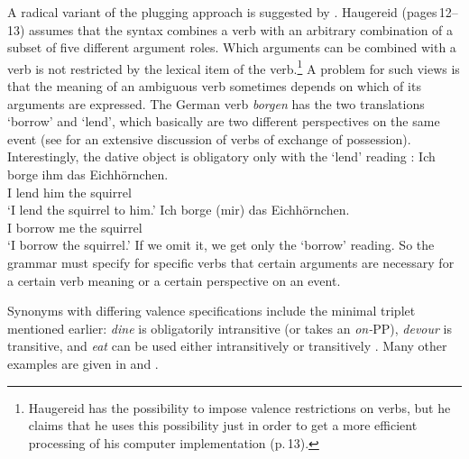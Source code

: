\begin{exe}
\begin{xlist}[iv.]
\begin{exe}
\begin{xlist}[iv.]
A radical variant of the plugging approach is suggested by \citet{Haugereid2009a}. Haugereid
(pages\,12--13) assumes that the syntax combines a verb with an arbitrary combination of a subset of
five different argument roles. Which arguments can be combined with a verb is not restricted by the
lexical item of the verb.\footnote{ 
  Haugereid has the possibility to impose valence restrictions on verbs, but he claims that he uses
  this possibility just in order to get a more efficient processing of his computer implementation (p.\,13).
}
A problem for such views is that the meaning of an ambiguous verb sometimes depends on which of its arguments are expressed. 
The German verb
\emph{borgen}
has the two translations `borrow' and `lend', which basically are two different perspectives on the same event (see
 for an extensive discussion of verbs of exchange of possession). 
Interestingly, the dative object is obligatory only with the `lend' reading \citep[]{MuellerGTBuch1}:
\eal
\ex 
\gll Ich borge ihm das Eichhörnchen.\\
     I   lend  him the squirrel\\
\glt `I lend the squirrel to him.'
\ex 
\gll Ich borge (mir) das Eichhörnchen.\\
     I borrow me the squirrel\\
\glt `I borrow the squirrel.'
\zl
If we omit it, we get only the `borrow' reading. 
So the grammar must specify for specific verbs that
 certain arguments are
necessary for a certain verb meaning or a certain perspective on an event.

Synonyms with differing valence specifications include the minimal triplet mentioned earlier: \emph{dine} is obligatorily intransitive (or takes an \emph{on-}PP), \emph{devour} is transitive, and \emph{eat} can be used either intransitively or transitively \citep[--90]{Dowty89b-u}.  Many other examples are given in  \citet{Levin93a-u} and \citet{LRH2005a-u}.
%



\end{xlist}
\end{exe}
\end{xlist}
\end{exe}
